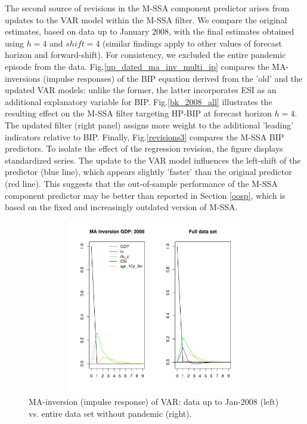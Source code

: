 \documentclass[a4paper]{article}
\begin{document}
The second source of revisions in the M-SSA component predictor arises from updates to the VAR model within the M-SSA filter. We compare the original estimates, based on data up to January 2008, with the final estimates obtained using $h=4$ and $shift=4$ (similar findings apply to other values of forecast horizon and forward-shift).  For consistency, we excluded the entire pandemic episode from the data. Fig.\eqref{up_dated_ma_inv_multi_ip} compares the MA-inversions (impulse responses) of the BIP equation derived from the 'old' and the updated VAR models: unlike the former, the latter incorporates ESI as an additional explanatory variable for BIP. Fig.\eqref{bk_2008_all} illustrates the resulting effect on the M-SSA filter targeting HP-BIP at forecast horizon $h=4$. The updated filter (right panel) assigns more weight to the additional 'leading' indicators relative to BIP. Finally, Fig.\eqref{revisions3} compares the M-SSA BIP predictors. To isolate the effect of the regression revision, the figure displays standardized series. The update to the VAR model influences the left-shift of the predictor (blue line), which appears slightly 'faster' than the original predictor (red line). This suggests that the out-of-sample performance of the M-SSA component predictor may be better than reported in Section \eqref{oosp}, which is based on the fixed and increasingly outdated version of M-SSA.
\begin{figure}[H]\begin{center}\includegraphics[height=3in, width=5in]{./Figures/up_dated_ma_inv_multi_ip.pdf}\caption{MA-inversion (impulse response) of VAR: data up to Jan-2008 (left) vs. entire data set  without pandemic (right).\label{up_dated_ma_inv_multi_ip}}\end{center}\end{figure}
\end{document}
